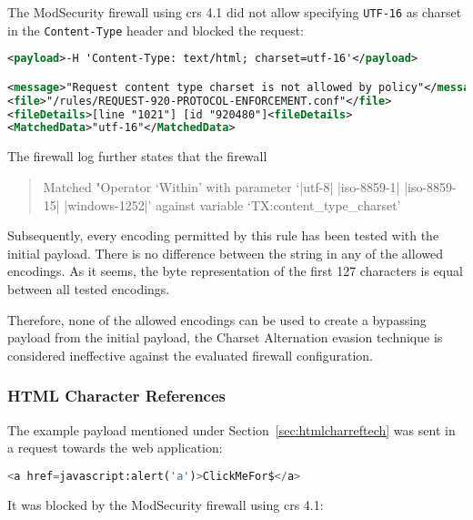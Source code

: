 The ModSecurity firewall using \acrshort{crs} 4.1 did not allow specifying \verb|UTF-16| as charset in the \verb|Content-Type| header and blocked the request:

\begin{lstlisting}[style=ruleStyle, language=XML, caption=utf-16 charset header blocked, label={lst:utf16charsetheaderblocked}]
<payload>-H 'Content-Type: text/html; charset=utf-16'</payload>

<message>"Request content type charset is not allowed by policy"</message>
<file>"/rules/REQUEST-920-PROTOCOL-ENFORCEMENT.conf"</file>
<fileDetails>[line "1021"] [id "920480"]<fileDetails>
<MatchedData>"utf-16"</MatchedData>
\end{lstlisting}

The firewall log further states that the firewall

\begin{quote}
	Matched "Operator `Within' with parameter `|utf-8| |iso-8859-1| |iso-8859-15| |windows-1252|' against variable `TX:content\_type\_charset'
\end{quote}

Subsequently, every encoding permitted by this rule has been tested with the initial payload. There is no difference between the string in any of the allowed encodings. As it seems, the byte representation of the first 127 characters is equal between all tested encodings. \cite{enc/diffa, enc/diffb, enc/diffc}

Therefore, none of the allowed encodings can be used to create a bypassing payload from the initial payload, the Charset Alternation evasion technique is considered ineffective against the evaluated firewall configuration.


\subsubsection{HTML Character References}
\label{sec:htmlcharrefsingleeva}
The example payload mentioned under Section~\ref{sec:htmlcharreftech} was sent in a request towards the web application:

\begin{lstlisting}[style=basicStyle, language=Python]
<a href=javascript:alert('a')>ClickMeFor$</a>
\end{lstlisting}

It was blocked by the ModSecurity firewall using \acrshort{crs} 4.1:

